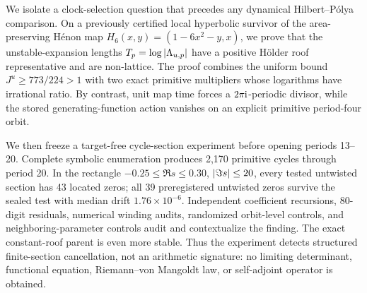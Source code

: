 We isolate a clock-selection question that precedes any dynamical
Hilbert--P\'olya comparison.  On a previously certified local hyperbolic
survivor of the area-preserving H\'enon map
\(H_6(x,y)=(1-6x^2-y,x)\), we prove that the unstable-expansion lengths
\(T_p=\log\left|\Lambda_{u,p}\right|\) have a positive H\"older roof representative
and are non-lattice.  The proof combines the uniform bound
\(J^u\ge 773/224>1\) with two exact primitive multipliers whose logarithms
have irrational ratio.  By contrast, unit map time forces a
\(2\pi\mathrm{i}\)-periodic divisor, while the stored generating-function action
vanishes on an explicit primitive period-four orbit.

We then freeze a target-free cycle-section experiment before opening periods
13--20.  Complete symbolic enumeration produces 2,170 primitive cycles
through period 20.  In the rectangle
\(-0.25\le\Re s\le0.30\), \(\left|\Im s\right|\le20\), every tested untwisted
section has 43 located zeros; all 39 preregistered untwisted zeros survive the
sealed test with median drift \(1.76\times10^{-6}\).  Independent coefficient
recursions, 80-digit residuals, numerical winding audits, randomized
orbit-level controls, and neighboring-parameter controls audit and
contextualize the finding.  The exact constant-roof parent is even more
stable.  Thus the
experiment detects structured finite-section cancellation, not an arithmetic
signature: no limiting determinant, functional equation, Riemann--von
Mangoldt law, or self-adjoint operator is obtained.
